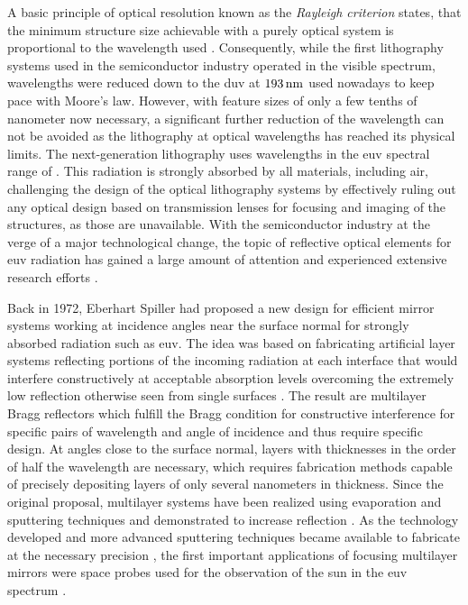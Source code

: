 A basic principle of optical resolution known as the \emph{Rayleigh criterion} states, that the minimum structure size achievable with a purely optical system is proportional to the wavelength used \cite{lord_rayleigh_xxxi._1879}. Consequently, while the first lithography systems used in the semiconductor industry operated in the visible spectrum, wavelengths were reduced down to the \gls{duv} at $\nm{193}$ used nowadays to keep pace with Moore's law. However, with feature sizes of only a few tenths of nanometer now necessary, a significant further reduction of the wavelength can not be avoided as the lithography at optical wavelengths has reached its physical limits. The next-generation lithography uses wavelengths in the \gls{euv} spectral range of . This radiation is strongly absorbed by all materials, including air, challenging the design of the optical lithography systems by effectively ruling out any optical design based on transmission lenses for focusing and imaging of the structures, as those are unavailable. With the semiconductor industry at the verge of a major technological change, the topic of reflective optical elements for \gls{euv} radiation has gained a large amount of attention and experienced extensive research efforts \cite{bakshi_euv_2009}.

Back in 1972, Eberhart Spiller had proposed a new design for efficient mirror systems working at incidence angles near the surface normal for strongly absorbed radiation such as \gls{euv}. The idea was based on fabricating artificial layer systems reflecting portions of the incoming radiation at each interface that would interfere constructively at acceptable absorption levels overcoming the extremely low reflection otherwise seen from single surfaces \cite{spiller_low-loss_1972}. The result are multilayer Bragg reflectors which fulfill the Bragg condition for constructive interference for specific pairs of wavelength and angle of incidence and thus require specific design. At angles close to the surface normal, layers with thicknesses in the order of half the wavelength are necessary, which requires fabrication methods capable of precisely depositing layers of only several nanometers in thickness. Since the original proposal, multilayer systems have been realized using evaporation and sputtering techniques and demonstrated to increase reflection \cite{spiller_reflective_1976, underwood_layered_1981}. As the technology developed and more advanced sputtering techniques became available to fabricate at the necessary precision \cite{stearns_fabrication_1991}, the first important applications of focusing multilayer mirrors were space probes used for the observation of the sun in the \gls{euv} spectrum \cite{chauvineau_description_1992, clette_eit:_1995, spiller_soft_1994}.

